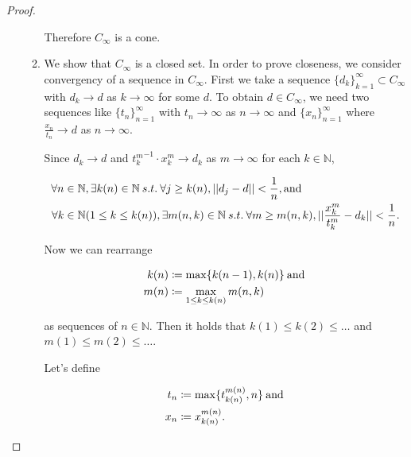 \documentclass[a4paper,11pt]{jsarticle}
\newcommand{\NaturalNumberSet}{\mathbb{N}}
\begin{document}
\begin{proof}
\begin{enumerate}[label=\roman*,align=CenterWithParen]
\begin{enumerate}[label=i-\alph*,align=CenterWithParen]
        Therefore $C_{\infty}$ is a cone.

        \item We show that $C_{\infty}$ is a closed set. In order to prove closeness, we consider convergency of a sequence in $C_{\infty}$. First we take a sequence $\{d_k\}_{k=1}^{\infty} \subset C_{\infty}$ with $d_k \rightarrow d$ as $k \rightarrow \infty$ for some $d$. To obtain $d \in C_{\infty}$, we need two sequences like $\{t_n\}_{n=1}^{\infty}$ with $t_n \rightarrow \infty$ as $n \rightarrow \infty$ and $\{x_n\}_{n=1}^{\infty}$ where $\frac{x_n}{t_n} \rightarrow d$ as $n \rightarrow \infty$.

        Since $d_k \rightarrow d$ and ${t_k^m}^{-1} \cdot x_k^m \rightarrow d_k$ as $m \rightarrow \infty$ for each $k \in \NaturalNumberSet$,

        \begin{equation}
          \begin{split}
            \forall n &\in \NaturalNumberSet, \exists k(n) \in \NaturalNumberSet \:s.t.\: \forall j \geq k(n), ||d_j -d|| < \frac{1}{n}, \text{and} \\
            \forall k &\in \NaturalNumberSet (1 \leq k \leq k(n)), \exists m(n,k) \in \NaturalNumberSet \:s.t.\: \forall m \geq m(n,k), ||\frac{x_k^m}{t_k^m} -d_k|| < \frac{1}{n}. \notag
          \end{split}
        \end{equation}

        Now we can rearrange

        \begin{equation}
          \begin{split}
          k(n) &\coloneqq \max\{k(n-1),k(n)\} \:\text{and}\: \\
          m(n) &\coloneqq \max_{1 \leq k \leq k(n)} m(n,k) \notag
          \end{split}
        \end{equation}

        as sequences of $n \in \NaturalNumberSet$. Then it holds that $k(1) \leq k(2) \leq \ldots$ and $m(1) \leq m(2) \leq \ldots$.

        Let's define

        \begin{equation}
          \begin{split}
            t_n &\coloneqq \max\{t_{k(n)}^{m(n)}, n\} \:\text{and}\: \\
            x_n &\coloneqq x_{k(n)}^{m(n)}. \notag
          \end{split}
        \end{equation}


\end{enumerate}
\end{enumerate}
\end{proof}
\end{document}
